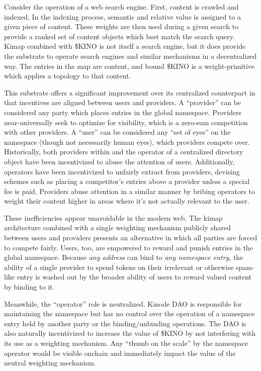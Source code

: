 \documentclass[runningheads]{llncs}
\begin{document}
Consider the operation of a web search engine.
First, content is crawled and indexed.
In the indexing process, semantic and relative value is assigned to a given piece of content.
These weights are then used during a given search to provide a ranked set of content objects which best match the search query.
Kimap combined with \$KINO is not itself a search engine, but it does provide the substrate to operate search engines and similar mechanisms in a decentralized way.
The entries in the map are content, and bound \$KINO is a weight-primitive which applies a topology to that content.

This substrate offers a significant improvement over its centralized counterpart in that incentives are aligned between users and providers.
A ``provider'' can be considered any party which places entries in the global namespace.
Providers near-universally seek to optimize for visibility, which is a zero-sum competition with other providers.
A ``user'' can be considered any ``set of eyes'' on the namespace (though not necessarily human eyes), which providers compete over.
Historically, both providers within and the operator of a centralized directory object have been incentivized to abuse the attention of users.
Additionally, operators have been incentivized to unfairly extract from providers, devising schemes such as placing a competitor's entries above a provider unless a special fee is paid.
Providers abuse attention in a similar manner by bribing operators to weight their content higher in areas where it's not actually relevant to the user.

These inefficiencies appear unavoidable in the modern web.
The kimap architecture combined with a single weighting mechanism publicly shared between users and providers presents an alternative in which all parties are forced to compete fairly.
Users, too, are empowered to reward and punish entries in the global namespace.
Because \textit{any address} can bind to \textit{any namespace entry}, the ability of a single provider to spend tokens on their irrelevant or otherwise spam-like entry is washed out by the broader ability of users to reward valued content by binding to it.

Meanwhile, the ``operator'' role is neutralized.
Kinode DAO is responsible for maintaining the namespace but has no control over the operation of a namespace entry held by another party or the binding/unbinding operations.
The DAO is also naturally incentivized to increase the value of \$KINO by not interfering with its use as a weighting mechanism.
Any ``thumb on the scale'' by the namespace operator would be visible onchain and immediately impact the value of the neutral weighting mechanism.
\end{document}
